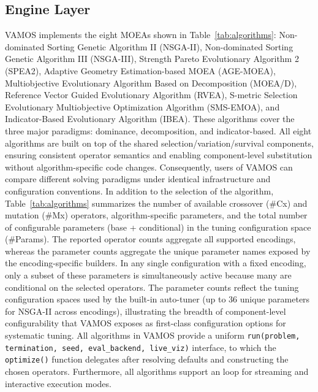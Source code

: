 \documentclass[final,5p,times,twocolumn]{elsarticle}
\begin{document}
\subsection{Engine Layer}

VAMOS implements the eight MOEAs shown in Table~\ref{tab:algorithms}: Non-dominated Sorting Genetic Algorithm II (NSGA-II), Non-dominated Sorting Genetic Algorithm III (NSGA-III), Strength Pareto Evolutionary Algorithm 2 (SPEA2), Adaptive Geometry Estimation-based MOEA (AGE-MOEA), Multiobjective Evolutionary Algorithm Based on Decomposition (MOEA/D), Reference Vector Guided Evolutionary Algorithm (RVEA), S-metric Selection Evolutionary Multiobjective Optimization Algorithm (SMS-EMOA), and Indicator-Based Evolutionary Algorithm (IBEA). These algorithms cover the three major paradigms: dominance, decomposition, and indicator-based. All eight algorithms are built on top of the shared selection/variation/survival components, ensuring consistent operator semantics and enabling component-level substitution without algorithm-specific code changes. Consequently, users of VAMOS can compare different solving paradigms under identical infrastructure and configuration conventions. In addition to the selection of the algorithm, Table~\ref{tab:algorithms} summarizes the number of available crossover (\#Cx) and mutation (\#Mx) operators, algorithm-specific parameters, and the total number of configurable parameters (base + conditional) in the tuning configuration space (\#Params). The reported operator counts aggregate all supported encodings, whereas the parameter counts aggregate the unique parameter names exposed by the encoding-specific builders. In any single configuration with a fixed encoding, only a subset of these parameters is simultaneously active because many are conditional on the selected operators. The parameter counts reflect the tuning configuration spaces used by the built-in auto-tuner (up to 36 unique parameters for NSGA-II across encodings), illustrating the breadth of component-level configurability that VAMOS exposes as first-class configuration options for systematic tuning. All algorithms in VAMOS provide a uniform \texttt{run(problem, termination, seed, eval\_backend, live\_viz)} interface, to which the  \texttt{optimize()} function delegates after resolving defaults and constructing the chosen operators. Furthermore, all algorithms support an  loop for streaming and interactive execution modes.
\end{document}
